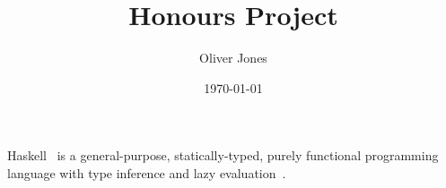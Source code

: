 \documentclass[12pt, a4paper]{article}
\title{Honours Project}
\author{Oliver Jones}
\date{\today}
\begin{document}
\maketitle
\tableofcontents

Haskell~\cite{haskell} is a general-purpose, statically-typed, purely
    functional programming language with type inference and lazy
    evaluation~\cite{wiki-haskell}.

\printbibliography
\end{document}
